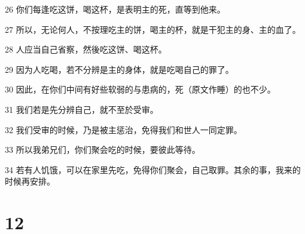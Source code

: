 \par 26 你们每逢吃这饼，喝这杯，是表明主的死，直等到他来。
\par 27 所以，无论何人，不按理吃主的饼，喝主的杯，就是干犯主的身、主的血了。
\par 28 人应当自己省察，然後吃这饼、喝这杯。
\par 29 因为人吃喝，若不分辨是主的身体，就是吃喝自己的罪了。
\par 30 因此，在你们中间有好些软弱的与患病的，死（原文作睡）的也不少。
\par 31 我们若是先分辨自己，就不至於受审。
\par 32 我们受审的时候，乃是被主惩治，免得我们和世人一同定罪。
\par 33 所以我弟兄们，你们聚会吃的时候，要彼此等待。
\par 34 若有人饥饿，可以在家里先吃，免得你们聚会，自己取罪。其余的事，我来的时候再安排。

\chapter{12}

